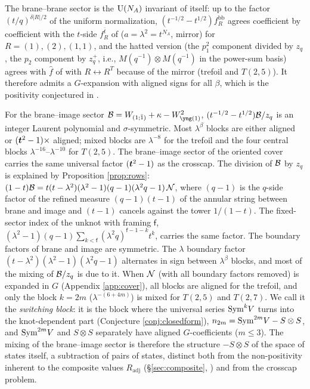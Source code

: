 The brane--brane sector is the $\mathrm{U}(N_A)$ invariant of \cite{KN17} itself: up to the factor $(t/q)^{\delta|R|/2}$ of the uniform normalization, $(t^{-1/2} - t^{1/2}) f^{\mathrm{bb}}_R$ agrees coefficient by coefficient with the $t$-side $f^{\bar t}_R$ of \cite{KN17} ($a = \lambda^2 = t^{N_A}$, mirror) for $R = (1), (2), (1,1)$, and the hatted version (the $p_1^2$ component divided by $z_q$, the $p_2$ component by $z_q^+$, i.e., $M(q^{-1})\otimes M(q^{-1})$ in the power-sum basis) agrees with $\hat f$ of \cite{KN17} with $R \leftrightarrow R^T$ because of the mirror (trefoil and $T(2,5)$). It therefore admits a $G$-expansion with aligned signs for all $\beta$, which is the positivity conjectured in \cite{KN17}.

For the brane--image sector $\Bim = W_{(1;\bar1)} + \kappa - W_{\yone}^2$, $(t^{-1/2} - t^{1/2})\mathcal{B}/z_q$ is an integer Laurent polynomial and $\sigma$-symmetric. Most $\lambda^\beta$ blocks are either aligned or $(\bm{t}^2 - 1)\times$ aligned; mixed blocks are $\lambda^{-8}$ for the trefoil and the four central blocks $\lambda^{-16}$--$\lambda^{-10}$ for $T(2,5)$.
The brane--image sector of the oriented cover carries the same universal factor $(\bm{t}^2 - 1)$ as the crosscap.
The division of $\mathcal{B}$ by $z_q$ is explained by Proposition \ref{prop:rows}: $(1-t)\mathcal{B} = t(t - \lambda^2)(\lambda^2 - 1)(q - 1)(\lambda^2 q - 1)\,\mathcal{N}$, where $(q-1)$ is the $q$-side factor of the refined measure $(q-1)(t-1)$ of the annular string between brane and image and $(t-1)$ cancels against the tower $1/(1-t)$. The fixed-sector index of the unknot with framing $\mathsf f$, $(\lambda^2-1)(q-1)\sum_{k<\mathsf f}(\lambda^2q)^{\mathsf f-1-k}t^k$, carries the same factor. The boundary factors of brane and image are symmetric.
The $\lambda$ boundary factor $(t-\lambda^2)(\lambda^2-1)(\lambda^2q-1)$ alternates in sign between $\lambda^\beta$ blocks, and most of the mixing of $\mathcal{B}/z_q$ is due to it. When $\mathcal{N}$ (with all boundary factors removed) is expanded in $G$ (Appendix \ref{app:cover}), all blocks are aligned for the trefoil, and only the block $k = 2m$ ($\lambda^{-(6+4m)}$) is mixed for $T(2,5)$ and $T(2,7)$. We call it the \emph{switching block}: it is the block where the universal series $\mathrm{Sym}^kV$ turns into the knot-dependent part (Conjecture \ref{conj:closedform}), $n_{2m} = \mathrm{Sym}^{2m}V - S\otimes S$, and $\mathrm{Sym}^{2m}V$ and $S\otimes S$ separately have aligned $G$-coefficients ($m \le 3$). The mixing of the brane--image sector is therefore the structure $-S\otimes S$ of the space of states itself, a subtraction of pairs of states, distinct both from the non-positivity inherent to the composite values $R_{\mathrm{adj}}$ (\S\ref{sec:composite}, \cite{CE15}) and from the crosscap problem.

